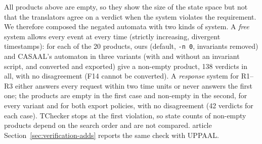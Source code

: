 All products above are empty, so they show the size of the state space but not
that the translators agree on a verdict when the system violates the
requirement. We therefore composed the negated automata with two kinds of
system. A \emph{free} system allows every event at every time (strictly
increasing, divergent timestamps): for each of the 20 products, ours (default,
\texttt{-n 0}, invariants removed) and CASAAL's automaton in three variants (with and without an invariant script, and converted and exported) give a
non-empty product, 138 verdicts in all, with no disagreement (F14 cannot be converted).
A \emph{response} system for R1--R3 either answers every request within two
time units or never answers the first one; the products are empty in the first
case and non-empty in the second, for every variant and for both export
policies, with no disagreement (42 verdicts for each case). TChecker stops at
the first violation, so state counts of non-empty products depend on the search
order and are not compared. article Section~\ref{sec:verification-adds} reports the same check
with UPPAAL.


